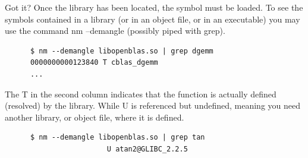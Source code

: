 \documentclass[12pt,aspectratio=169]{beamer}
\begin{document}
  
  
  \begin{frame}[fragile]{Got it?}  
    Once the library has been located, the symbol must be loaded.
    To see the symbols contained in a library (or in an object file, or in
    an executable) you may use the command nm --demangle (possibly
    piped with grep).

    \begin{verbatim}
      $ nm --demangle libopenblas.so | grep dgemm
      0000000000123840 T cblas_dgemm
      ...
    \end{verbatim}
    The \alert{T} in the second column indicates that the function is actually defined (resolved) by the library. While \alert{U} is referenced but undefined, meaning you need
    another library, or object file, where it is defined.
    \begin{verbatim}
      $ nm --demangle libopenblas.so | grep tan
                        U atan2@GLIBC_2.2.5
    \end{verbatim}
    
  \end{frame}
\end{document}
